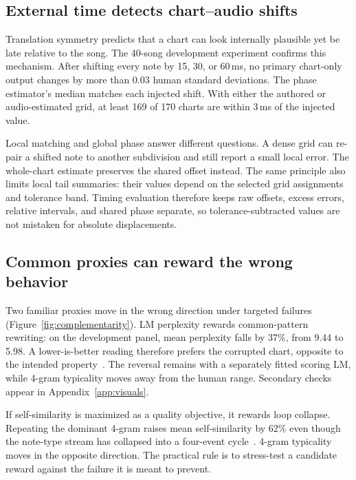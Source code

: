 \documentclass[10pt,twocolumn]{article}
\newcommand{\figref}[1]{Figure~\ref{#1}}
\begin{document}
\subsection{External time detects chart--audio shifts}
\label{sec:anchorresults}

Translation symmetry predicts that a chart can look internally plausible yet
be late relative to the song. The 40-song development experiment confirms
this mechanism. After shifting every note by 15, 30, or 60\,ms, no primary
chart-only output changes by more than 0.03 human standard deviations. The
phase estimator's median matches each injected shift. With either the authored
or audio-estimated grid, at least 169 of 170 charts are within 3\,ms of the
injected value.

Local matching and global phase answer different questions. A dense grid can
re-pair a shifted note to another subdivision and still report a small local
error. The whole-chart estimate preserves the shared offset instead. The same
principle also limits local tail summaries: their values depend on the
selected grid assignments and tolerance band. Timing evaluation therefore
keeps raw offsets, excess errors, relative intervals, and shared phase
separate, so tolerance-subtracted values are not mistaken for absolute
displacements.

\subsection{Common proxies can reward the wrong behavior}
\label{sec:reductio}

Two familiar proxies move in the wrong direction under targeted failures
(\figref{fig:complementarity}). LM perplexity rewards common-pattern
rewriting: on the development panel, mean perplexity falls by 37\%, from 9.44
to 5.98. A lower-is-better reading therefore prefers the corrupted chart,
opposite to the intended property~\cite{theis2016note}. The reversal remains
with a separately fitted scoring LM, while 4-gram typicality moves away from
the human range. Secondary checks appear in Appendix~\ref{app:visuals}.

If self-similarity is maximized as a quality objective, it rewards loop
collapse. Repeating the dominant 4-gram raises mean self-similarity by 62\%
even though the note-type stream has collapsed into a four-event
cycle~\cite{wu2020jazz}.
4-gram typicality moves in the opposite direction. The practical rule is to
stress-test a candidate reward against the failure it is meant to prevent.
\end{document}
